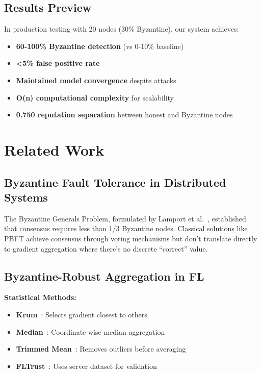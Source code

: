 \documentclass[conference]{IEEEtran}
\begin{document}
\subsection{Results Preview}

In production testing with 20 nodes (30\% Byzantine), our system achieves:
\begin{itemize}
\item \textbf{60-100\% Byzantine detection} (vs 0-10\% baseline)
\item \textbf{<5\% false positive rate}
\item \textbf{Maintained model convergence} despite attacks
\item \textbf{O(n) computational complexity} for scalability
\item \textbf{0.750 reputation separation} between honest and Byzantine nodes
\end{itemize}

\section{Related Work}

\subsection{Byzantine Fault Tolerance in Distributed Systems}

The Byzantine Generals Problem, formulated by Lamport et al.~\cite{lamport1982byzantine}, established that consensus requires less than 1/3 Byzantine nodes. Classical solutions like PBFT achieve consensus through voting mechanisms but don't translate directly to gradient aggregation where there's no discrete ``correct'' value.

\subsection{Byzantine-Robust Aggregation in FL}

\textbf{Statistical Methods:}
\begin{itemize}
\item \textbf{Krum}~\cite{blanchard2017krum}: Selects gradient closest to others
\item \textbf{Median}~\cite{yin2018byzantine}: Coordinate-wise median aggregation
\item \textbf{Trimmed Mean}~\cite{yin2018byzantine}: Removes outliers before averaging
\item \textbf{FLTrust}~\cite{cao2020fltrust}: Uses server dataset for validation
\end{itemize}
\end{document}
